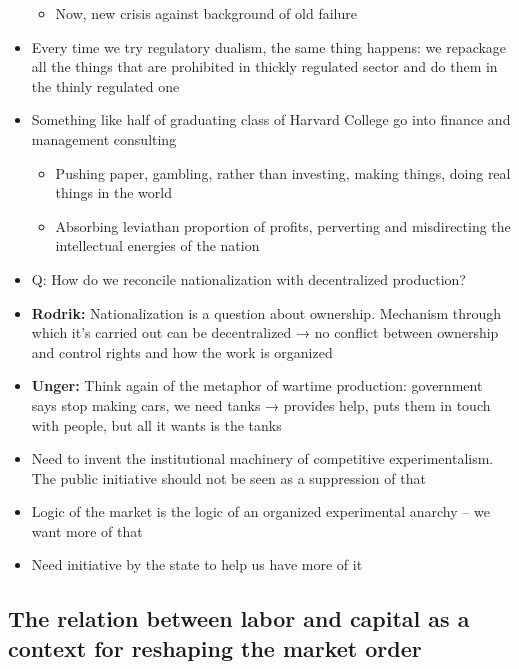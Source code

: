 \begin{itemize}
  \begin{itemize}
  \tightlist
  \item
    Now, new crisis against background of old failure
  \end{itemize}
\item
  Every time we try regulatory dualism, the same thing happens: we
  repackage all the things that are prohibited in thickly regulated
  sector and do them in the thinly regulated one
\item
  Something like half of graduating class of Harvard College go into
  finance and management consulting

  \begin{itemize}
  \tightlist
  \item
    Pushing paper, gambling, rather than investing, making things, doing
    real things in the world
  \item
    Absorbing leviathan proportion of profits, perverting and
    misdirecting the intellectual energies of the nation
  \end{itemize}
\item
  Q: How do we reconcile nationalization with decentralized production?
\item
  \textbf{Rodrik:} Nationalization is a question about ownership.
  Mechanism through which it's carried out can be decentralized → no
  conflict between ownership and control rights and how the work is
  organized
\item
  \textbf{Unger:} Think again of the metaphor of wartime production:
  government says stop making cars, we need tanks → provides help, puts
  them in touch with people, but all it wants is the tanks
\item
  Need to invent the institutional machinery of competitive
  experimentalism. The public initiative should not be seen as a
  suppression of that
\item
  Logic of the market is the logic of an organized experimental anarchy
  -- we want more of that
\item
  Need initiative by the state to help us have more of it
\end{itemize}

\hypertarget{the-relation-between-labor-and-capital-as-a-context-for-reshaping-the-market-order}{%
\subsection{The relation between labor and capital as a context for
reshaping the market
order}\label{the-relation-between-labor-and-capital-as-a-context-for-reshaping-the-market-order}}

